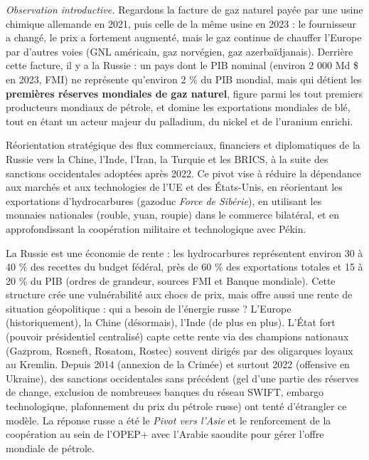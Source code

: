 \documentclass[11pt]{article}
\newcommand{\cle}[1]{{\popxbold\color{popdark}#1}}
\begin{document}
\emph{Observation introductive.} Regardons la facture de gaz naturel payée par une usine chimique allemande en 2021, puis celle de la même usine en 2023 : le fournisseur a changé, le prix a fortement augmenté, mais le gaz continue de chauffer l'Europe par d'autres voies (GNL américain, gaz norvégien, gaz azerbaïdjanais). Derrière cette facture, il y a la Russie : un pays dont le PIB nominal (environ 2 000 Md \$ en 2023, FMI) ne représente qu'environ 2 \% du PIB mondial, mais qui détient les \textbf{premières réserves mondiales de gaz naturel}, figure parmi les tout premiers producteurs mondiaux de pétrole, et domine les exportations mondiales de blé, tout en étant un acteur majeur du palladium, du nickel et de l'uranium enrichi.

\begin{definition}
Réorientation stratégique des flux commerciaux, financiers et diplomatiques de la Russie vers la Chine, l'Inde, l'Iran, la Turquie et les BRICS, à la suite des sanctions occidentales adoptées après 2022. Ce pivot vise à réduire la dépendance aux marchés et aux technologies de l'UE et des États-Unis, en réorientant les exportations d'hydrocarbures (gazoduc \emph{Force de Sibérie}), en utilisant les monnaies nationales (rouble, yuan, roupie) dans le commerce bilatéral, et en approfondissant la coopération militaire et technologique avec Pékin.
\end{definition}

La Russie est une \cle{économie de rente} : les hydrocarbures représentent environ 30 à 40 \% des recettes du budget fédéral, près de 60 \% des exportations totales et 15 à 20 \% du PIB (ordres de grandeur, sources FMI et Banque mondiale). Cette structure crée une vulnérabilité aux chocs de prix, mais offre aussi une \cle{rente de situation} géopolitique : qui a besoin de l'énergie russe ? L'Europe (historiquement), la Chine (désormais), l'Inde (de plus en plus). L'État fort (pouvoir présidentiel centralisé) capte cette rente via des champions nationaux (Gazprom, Rosneft, Rosatom, Rostec) souvent dirigés par des \cle{oligarques} loyaux au Kremlin. Depuis 2014 (annexion de la Crimée) et surtout 2022 (offensive en Ukraine), des sanctions occidentales sans précédent (gel d'une partie des réserves de change, exclusion de nombreuses banques du réseau SWIFT, embargo technologique, plafonnement du prix du pétrole russe) ont tenté d'étrangler ce modèle. La réponse russe a été le \emph{Pivot vers l'Asie} et le renforcement de la coopération au sein de l'\cle{OPEP+} avec l'Arabie saoudite pour gérer l'offre mondiale de pétrole.
\end{document}
